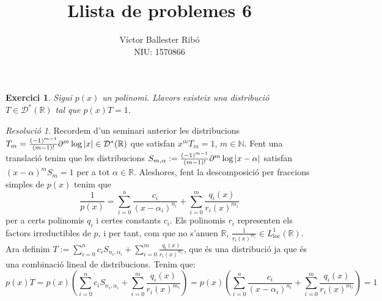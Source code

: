 \documentclass[10pt,a4paper]{article}
\title{\bfseries\Large Llista de problemes 6}
\author{Víctor Ballester Ribó\\NIU: 1570866}
\date{\parbox{\linewidth}{\centering
  Anàlisi Harmònica\endgraf
  Grau en Matemàtiques\endgraf
  Universitat Autònoma de Barcelona\endgraf
  Maig de 2023}}
\newcommand{\NN}{\ensuremath{\mathbb{N}}} %
\newcommand{\RR}{\ensuremath{\mathbb{R}}} %
\newtheorem{exercici}{Exercici}
\theoremstyle{definition}
\theoremstyle{remark}
\newtheorem*{res}{Resolució}
\begin{document}
\maketitle
\setcounter{exercici}{1}
\begin{exercici}
  Sigui $p(x)$ un polinomi. Llavors existeix una distribució $T\in\mathcal{D}^*(\RR)$ tal que $p(x)T=1$.
\end{exercici}
\begin{res}
  Recordem d'un seminari anterior les distribucions $T_m=\frac{{(-1)}^{m-1}}{(m-1)!}\partial^m\log\abs{x}\in \mathcal{D}^*(\RR)$ que satisfan $x^mT_m=1$, $m\in\NN$. Fent una translació tenim que les distribucions $S_{m,\alpha}:=\frac{{(-1)}^{m-1}}{(m-1)!}\partial^m\log\abs{x-\alpha}$ satisfan ${(x-\alpha)}^mS_m=1$ per a tot $\alpha\in\RR$.
  Aleshores, fent la descomposició per fraccions simples de $p(x)$ tenim que
  $$
    \frac{1}{p(x)} = \sum_{i=0}^n \frac{c_i}{{(x-\alpha_i)}^{n_i}}+\sum_{i=0}^{m} \frac{q_i(x)}{r_i(x)^{m_i}}
  $$
  per a certs polinomis $q_i$ i certes constants $c_i$. Els polinomis $r_i$ representen els factors irreductibles de $p$, i per tant, com que no s'anu\lgem en $\RR$, $\frac{1}{{r_i(x)}^{m_i}}\in L_\mathrm{loc}^1(\RR)$. Ara definim $T:= \sum_{i=0}^n c_iS_{n_i,\alpha_i} +\sum_{i=0}^{m} \frac{q_i(x)}{r_i(x)^{m_i}}$, que és una distribució ja que és una combinació lineal de distribucions. Tenim que:
  $$
    p(x)T=p(x)\left(\sum_{i=0}^n c_iS_{n_i,\alpha_i}+\sum_{i=0}^{m} \frac{q_i(x)}{r_i(x)^{m_i}}\right) =p(x) \left(\sum_{i=0}^n \frac{c_i}{{(x-\alpha_i)}^{n_i}}+\sum_{i=0}^{m} \frac{q_i(x)}{r_i(x)^{m_i}}\right) =1
  $$
\end{res}
\end{document}
